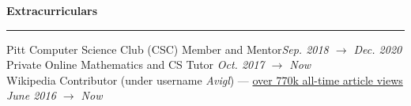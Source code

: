 \documentclass[10pt]{article}
\begin{document}
\begin{flushleft}
		\vspace{1.5mm}
		{\large \raggedright \textbf{Extracurriculars}}
		\vspace{1.25mm}
	
		\hrule
	
		\vspace{2.25mm}
		Pitt Computer Science Club (CSC) Member and Mentor\hfill \textit{\small Sep. 2018 $\rightarrow$ Dec. 2020}\\
		Private Online Mathematics and CS Tutor \hfill \textit{\small Oct. 2017 $\rightarrow$ Now}\\
		Wikipedia Contributor (under username \textit{Avigl}) --- \href{https://pageviews.toolforge.org/?project=en.wikipedia.org&platform=all-access&agent=user&redirects=0&range=all-time&pages=Timeline_of_social_media|Timeline_of_online_advertising|Timeline_of_e-commerce|Screening_Partnership_Program|Silicon_Valley_Education_Foundation|Chicago_Community_Trust}{over 770k all-time article views} \hfill \textit{\small June 2016 $\rightarrow$ Now}
		
	\end{flushleft}
\end{document}
